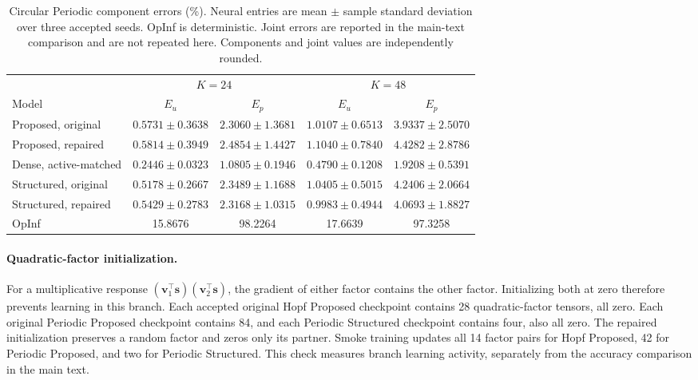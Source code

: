 \begin{table}[t]
\centering
\small
\setlength{\tabcolsep}{3.5pt}
\caption{Circular Periodic component errors (\%). Neural entries
are mean $\pm$ sample standard deviation over three accepted seeds.
OpInf is deterministic. Joint errors are reported in the main-text
comparison and are not repeated here. Components and joint values
are independently rounded.}
\label{tab:circular_full}
\begin{tabular}{@{}lcccc@{}}
\toprule
& \multicolumn{2}{c}{$K=24$} & \multicolumn{2}{c}{$K=48$}\\
\cmidrule(lr){2-3}\cmidrule(l){4-5}
Model & $E_u$ & $E_p$ & $E_u$ & $E_p$\\
\midrule
Proposed, original
& $0.5731\pm0.3638$ & $2.3060\pm1.3681$
& $1.0107\pm0.6513$ & $3.9337\pm2.5070$\\
Proposed, repaired
& $0.5814\pm0.3949$ & $2.4854\pm1.4427$
& $1.1040\pm0.7840$ & $4.4282\pm2.8786$\\
Dense, active-matched
& $0.2446\pm0.0323$ & $1.0805\pm0.1946$
& $0.4790\pm0.1208$ & $1.9208\pm0.5391$\\
Structured, original
& $0.5178\pm0.2667$ & $2.3489\pm1.1688$
& $1.0405\pm0.5015$ & $4.2406\pm2.0664$\\
Structured, repaired
& $0.5429\pm0.2783$ & $2.3168\pm1.0315$
& $0.9983\pm0.4944$ & $4.0693\pm1.8827$\\
OpInf & 15.8676 & 98.2264 & 17.6639 & 97.3258\\
\bottomrule
\end{tabular}
\end{table}

\paragraph{Quadratic-factor initialization.}
For a multiplicative response
$(\bm v_1^\top\bm s)(\bm v_2^\top\bm s)$, the gradient of either
factor contains the other factor. Initializing both at zero therefore
prevents learning in this branch.
Each accepted original Hopf Proposed checkpoint contains 28
quadratic-factor tensors, all zero. Each original Periodic Proposed
checkpoint contains 84, and each Periodic Structured checkpoint
contains four, also all zero.
The repaired initialization preserves a random factor and zeros
only its partner. Smoke training updates all 14 factor pairs for
Hopf Proposed, 42 for Periodic Proposed, and two for Periodic
Structured. This check measures branch learning activity, separately
from the accuracy comparison in the main text.

